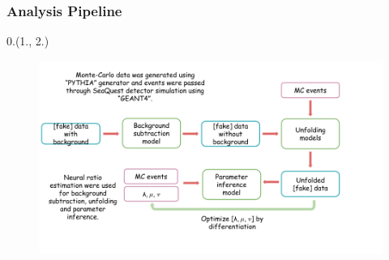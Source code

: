 \documentclass[10pt, xcolor={dvipsnames}, sans, mathserif, aspectratio=169]{beamer}
\newenvironment{Pic}[2]
{\begin{textblock}{#1}#2
\begin{figure}}
{\end{figure}
\end{textblock}}
\begin{document}
\begin{frame}
\frametitle{Analysis Pipeline}

\begin{Pic}{0.}{(1., 2.)}
	\includegraphics[width=15.cm]{pipeline.png}
\end{Pic}
\end{frame}
\end{document}

